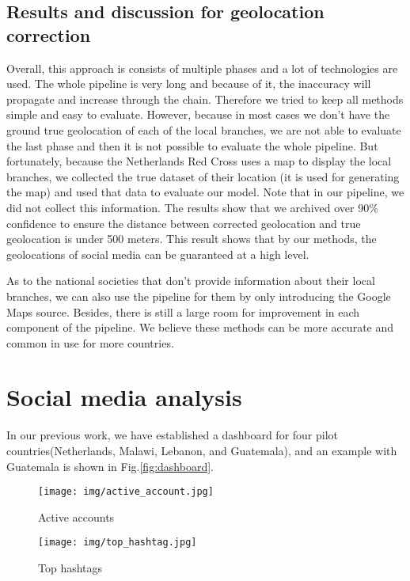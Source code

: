 \documentclass[sigchi]{acmart}
\begin{document}
\subsection{Results and discussion for geolocation correction}
Overall, this approach is consists of multiple phases and a lot of technologies are used. The whole pipeline is very long and because of it, the inaccuracy will propagate and increase through the chain. Therefore we tried to keep all methods simple and easy to evaluate. However, because in most cases we don't have the ground true geolocation of each of the local branches, we are not able to evaluate the last phase and then it is not possible to evaluate the whole pipeline. But fortunately, because the Netherlands Red Cross uses a map to display the local branches, we collected the true dataset of their location (it is used for generating the map) and used that data to evaluate our model. Note that in our pipeline, we did not collect this information. The results show that we archived over 90\% confidence to
ensure the distance between corrected geolocation and true geolocation is under 500 meters. This result shows that by our methods, the geolocations of social media can be guaranteed at a high level.

As to the national societies that don't provide information about their local branches, we can also use the pipeline for them by only introducing the Google Maps source. Besides, there is still a large room for improvement in each component of the pipeline. We believe these methods can be more accurate and common in use for more countries.

\section{Social media analysis}\label{sec:Social media analysis}
In our previous work, we have established a dashboard for four pilot countries(Netherlands, Malawi, Lebanon, and Guatemala), and an example with Guatemala is shown in Fig.\ref{fig:dashboard}.
\begin{figure*}
    \begin{subfigure}[b]{\textwidth}
        \texttt{[image: img/active\_account.jpg]}
        \caption{Active accounts}
        \label{fig:active_account}
    \end{subfigure}
    \begin{subfigure}[b]{\textwidth}
        \texttt{[image: img/top\_hashtag.jpg]}
        \caption{Top hashtags}
        \label{fig:top_hashtag}
    \end{subfigure}
    \caption{Dashboard of local branches map(Guatemala)}\label{fig:dashboard}
\end{figure*}
\end{document}
